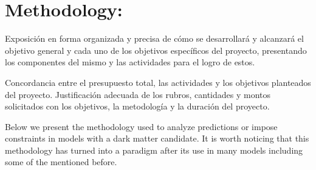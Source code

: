 \documentclass[a4paper,10pt,epsfig,epsf,amsfonts,amsmath]{article}
\begin{document}
\section{Methodology:                                 }
\begin{colciencias}
  Exposición en forma organizada y precisa de cómo se desarrollará y
  alcanzará el objetivo general y cada uno de los objetivos
  específicos del proyecto, presentando los componentes del mismo y
  las actividades para el logro de estos.
\end{colciencias}
\begin{evaluacion}
  Concordancia entre el presupuesto total, las
actividades y los objetivos planteados del proyecto.
Justificación adecuada de los rubros, cantidades y
montos solicitados con los objetivos, la metodología
y la duración del proyecto.
\end{evaluacion}

Below we present the methodology used to analyze predictions or impose
constraints in models with a dark matter candidate. It is worth
noticing that this methodology has turned into a paradigm after its
use in many models including some of the mentioned before.
\end{document}
